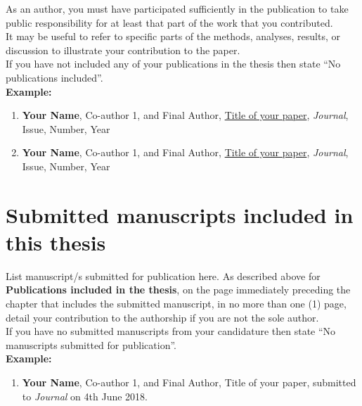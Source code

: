 \begin{instructional}
	\noindent
	As an author, you must have participated sufficiently in the publication to take public responsibility for at least that part of the work that you contributed.\\
    
    \noindent
	It may be useful to refer to specific parts of the methods, analyses, results, or discussion to illustrate your contribution to the paper.\\
    
    \noindent
	If you have not included any of your publications in the thesis then state ``No publications included''.\\
	
	\textbf{Example:}
	\begin{enumerate}

    \item \cite{DumyCitationKey} \textbf{Your Name}, Co-author 1, and Final Author, \href{linktoyourpaper}{Title of your paper}, \textit{Journal}, Issue, Number, Year

    \item \cite{DumyCitationKey} \textbf{Your Name}, Co-author 1, and Final Author, \href{linktoyourpaper}{Title of your paper}, \textit{Journal}, Issue, Number, Year

    \end{enumerate}
	
\end{instructional}

\nocite{macklin-cordes_phylogenetic_2021,
        macklin-cordes_re-evaluating_2020}
\printbibliography[keyword={included_publication},heading=none]



\section*{Submitted manuscripts included in this thesis}

\begin{instructional}
	List manuscript/s submitted for publication here. As described above for \textbf{Publications included in the thesis}, on the page immediately preceding the chapter that includes the submitted manuscript, in no more than one (1) page, detail your contribution to the authorship if you are not the sole author.\\
    
    \noindent
    If you have no submitted manuscripts from your candidature then state ``No manuscripts submitted for publication''.\\
    
    \textbf{Example:}
    \begin{enumerate}

    \item \cite{DumyCitationKey} \textbf{Your Name}, Co-author 1, and Final Author, Title of your paper, submitted to \textit{Journal} on 4th June 2018.

    \end{enumerate}
\end{instructional}

